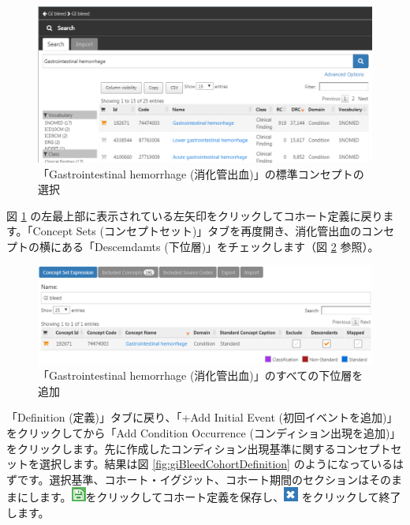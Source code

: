 \documentclass[
  11pt]{book}
\theoremstyle{definition}
\theoremstyle{definition}
\theoremstyle{definition}
\theoremstyle{definition}
\theoremstyle{remark}
\begin{document}
\begin{figure}

{\centering \includegraphics[width=1\linewidth]{images/SuggestedAnswers/giBleedSearch} 

}

\caption{「Gastrointestinal hemorrhage (消化管出血)」の標準コンセプトの選択}\label{fig:giBleedSearch}
\end{figure}

図 \ref{fig:giBleedSearch} の左最上部に表示されている左矢印をクリックしてコホート定義に戻ります。「Concept Sets (コンセプトセット)」タブを再度開き、消化管出血のコンセプトの横にある「Descemdamts (下位層)」をチェックします（図 \ref{fig:giBleedDescendants} 参照）。

\begin{figure}

{\centering \includegraphics[width=1\linewidth]{images/SuggestedAnswers/giBleedDescendants} 

}

\caption{「Gastrointestinal hemorrhage (消化管出血)」のすべての下位層を追加}\label{fig:giBleedDescendants}
\end{figure}

「Definition (定義)」タブに戻り、「+Add Initial Event (初回イベントを追加)」をクリックしてから「Add Condition Occurrence (コンディション出現を追加)」をクリックします。先に作成したコンディション出現基準に関するコンセプトセットを選択します。結果は図 \ref{fig:giBleedCohortDefinition} のようになっているはずです。選択基準、コホート・イグジット、コホート期間のセクションはそのままにします。\includegraphics{images/Cohorts/save.png}をクリックしてコホート定義を保存し、\includegraphics{images/SuggestedAnswers/close.png} をクリックして終了します。
\end{document}
